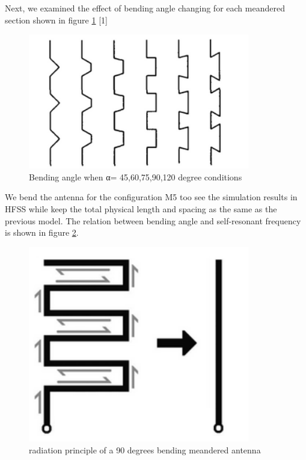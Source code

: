 Next, we examined the effect of bending angle changing for each meandered section shown in figure \ref{fig:efield_fig5} [1]

\begin{figure}[h]
	\begin{center}
		\includegraphics[width=3.8in]{./images/efield_image4.png}
		\caption{Bending angle when α= 45,60,75,90,120 degree conditions}
		\label{fig:efield_fig5}
	\end{center}
\end{figure}

We bend the antenna for the configuration M5 too see the simulation results in HFSS while keep the total physical length and spacing as the same as the previous model. The relation between bending angle and self-resonant frequency is shown in figure \ref{fig:efield_fig6}.

\begin{figure}[h]
	\begin{center}
		\includegraphics[width=3.8in]{./images/efield_image5.png}
		\caption{radiation principle of a 90 degrees bending meandered antenna }
		\label{fig:efield_fig6}
	\end{center}
\end{figure}

